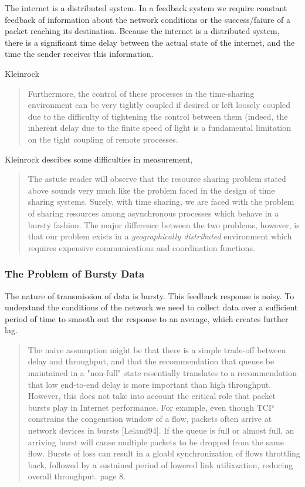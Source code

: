 The internet is a distributed system. In a feedback system we require constant feedback of
information about the network conditions or the success/faiure of a packet reaching its destination.
Because the internet is a distributed system, there is a significant time delay between the actual
state of the internet, and the time the sender receives this information. 

Kleinrock\cite{kleinrock 1978}

\begin{quote}
    Furthermore, the control of these processes in the time-sharing environment can be very tightly
    coupled if desired or left loosely coupled due to the difficulty of tightening the control
    between them (indeed, the inherent delay due to the finite speed of light is a fundamental
    limitation on the tight coupling of remote processes.
\end{quote}

Kleinrock descibes some difficulties in measurement\cite{kleinrock1978},

\begin{quote}
    The astute reader will observe that the resource sharing problem stated above sounds very much
    like the problem faced in the design of time sharing systems. Surely, with time sharing, we are
    faced with the problem of sharing resources among asynchronous processes which behave in a
    bursty fashion. The major difference between the two problems, however, is that our problem
    exists in a \emph{geographically distributed} environment which requires expensive
    communications and coordination functions.
\end{quote}

\subsubsection{The Problem of Bursty Data}

The nature of transmission of data is bursty. This feedback response is noisy. To understand the
conditions of the network we need to collect data over a sufficient period of time to smooth out the
response to an average, which creates further lag.


\begin{quote}
The naive assumption might be that there is a simple trade-off between delay and throughput, and
that the recommendation that queues be maintained in a "non-full" state essentially translates
to a recommendation that low end-to-end delay is more important than high throughput. However,
this does not take into account the critical role that packet bursts play in Internet
performance. For example, even though TCP constrains the congenstion window of a flow, packets
often arrive at network devices in bursts [Leland94]. If the queue is full or almost full, an
arriving burst will cause multiple packets to be dropped from the same flow. Bursts of loss can
result in a gloabl synchronization of flows throttling back, followed by a sustained period of
lowered link utilixzation, reducing overall throughput. \cite{rfc7567} page 8.
\end{quote}

